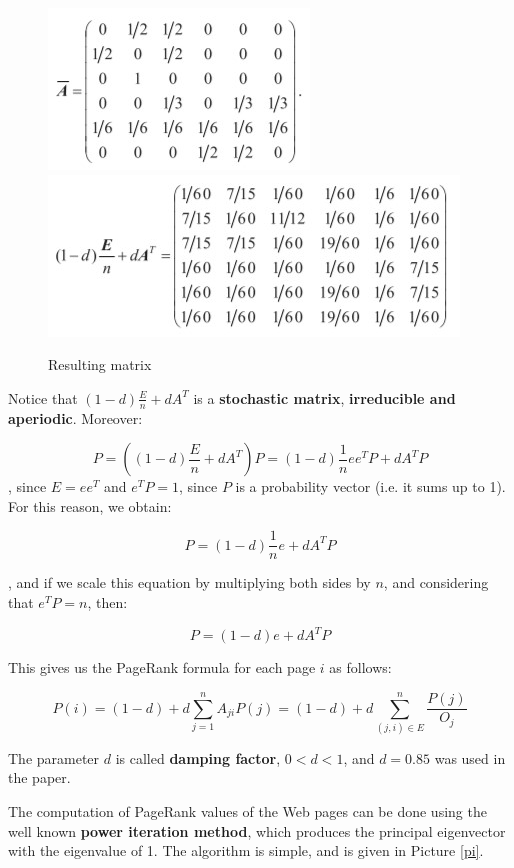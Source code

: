 \begin{figure}[h!]
		\centering
        \includegraphics[scale = 1.8]{img/dangling matrix 2.jpg}
		\includegraphics[scale = 1.8]{img/final matrix.jpg}
		\label{improved model}
        \caption{Resulting matrix}
\end{figure}

Notice that $(1-d) \frac{E}{n} + dA^T$ is a \textbf{stochastic matrix}, \textbf{irreducible and aperiodic}. Moreover:

$$
P = ((1-d) \frac{E}{n} + dA^T) P = (1-d)\frac{1}{n} ee^T P + dA^TP 
$$
, since $E = ee^T$ and $e^T P = 1$, since $P$ is a probability vector (i.e. it sums up to 1). For this reason, we obtain:

$$
P = (1-d)\frac{1}{n} e + dA^TP
$$

, and if we scale this equation by multiplying both sides by $n$, and considering that $e^TP = n$, then:

$$
P = (1-d)e + dA^TP
$$

This gives us the PageRank formula for each page $i$ as follows:

$$
P(i) = (1-d) + d \sum_{j = 1}^n A_{ji} P(j) = (1-d) + d \sum_{(j,i) \in E}^n \frac{P(j)}{O_j}
$$

The parameter $d$ is called \textbf{damping factor}, $0 < d < 1$, and $d = 0.85$ was used in the paper.

The computation of PageRank values of the Web pages can be done using the well known \textbf{power iteration method}, which produces the principal eigenvector with the eigenvalue of 1. The algorithm is simple, and is given in Picture \ref{pi}. 

